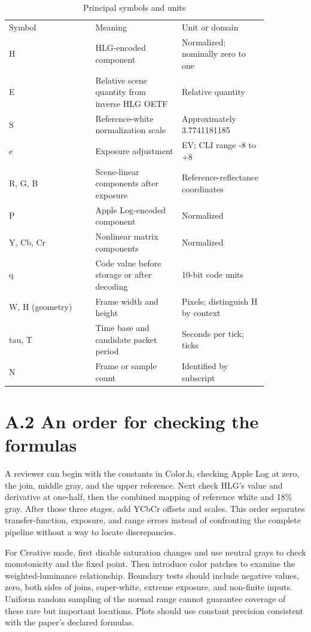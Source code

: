 \documentclass[11pt,a4paper,openany]{book}
\begin{document}
\begin{longtable}{p{0.287\linewidth}p{0.287\linewidth}p{0.287\linewidth}}
\caption{Principal symbols and units}\\
\toprule
Symbol & Meaning & Unit or domain\\
H & HLG-encoded component & Normalized; nominally zero to one\\
E & Relative scene quantity from inverse HLG OETF & Relative quantity\\
S & Reference-white normalization scale & Approximately 3.7741181185\\
e & Exposure adjustment & EV; CLI range -8 to +8\\
R, G, B & Scene-linear components after exposure & Reference-reflectance coordinates\\
P & Apple Log-encoded component & Normalized\\
Y, Cb, Cr & Nonlinear matrix components & Normalized\\
q & Code value before storage or after decoding & 10-bit code units\\
W, H (geometry) & Frame width and height & Pixels; distinguish H by context\\
tau, T & Time base and candidate packet period & Seconds per tick; ticks\\
N & Frame or sample count & Identified by subscript\\
\bottomrule
\end{longtable}

\section*{A.2 An order for checking the formulas}
A reviewer can begin with the constants in Color.h, checking Apple Log at zero, the join, middle gray, and the upper reference. Next check HLG's value and derivative at one-half, then the combined mapping of reference white and 18\% gray. After those three stages, add YCbCr offsets and scales. This order separates transfer-function, exposure, and range errors instead of confronting the complete pipeline without a way to locate discrepancies.

For Creative mode, first disable saturation changes and use neutral grays to check monotonicity and the fixed point. Then introduce color patches to examine the weighted-luminance relationship. Boundary tests should include negative values, zero, both sides of joins, super-white, extreme exposure, and non-finite inputs. Uniform random sampling of the normal range cannot guarantee coverage of these rare but important locations. Plots should use constant precision consistent with the paper's declared formulas.
\end{document}
